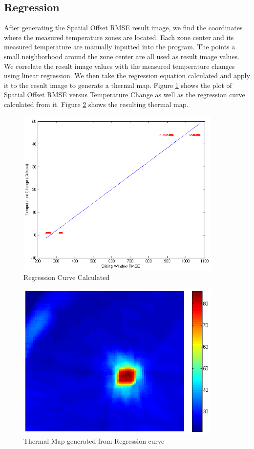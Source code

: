 \documentclass[]{spie}  %
\begin{document}
\subsection{Regression}

After generating the Spatial Offset RMSE result image, we find the coordinates where the measured temperature zones are located. Each zone center and its measured temperature are manually inputted into the program. The points a small neighborhood around the zone center are all used as result image values. We correlate the result image values with the measured temperature changes using linear regression. We then take the regression equation calculated and apply it to the result image to generate a thermal map. Figure \ref{RegressionCurve} shows the plot of Spatial Offset RMSE versus Temperature Change as well as the regression curve calculated from it. Figure \ref{ThermalMap} shows the resulting thermal map.

\begin{figure} 
\centering 
\includegraphics[width=4in]{slidingDiffRegression2.png} 
\caption{Regression Curve Calculated} 
\label{RegressionCurve}
\end{figure}

\begin{figure} 
\centering 
\includegraphics[width=4in]{slidingDiffThermalMap2.png} 
\caption{Thermal Map generated from Regression curve} 
\label{ThermalMap}
\end{figure}
\end{document}
